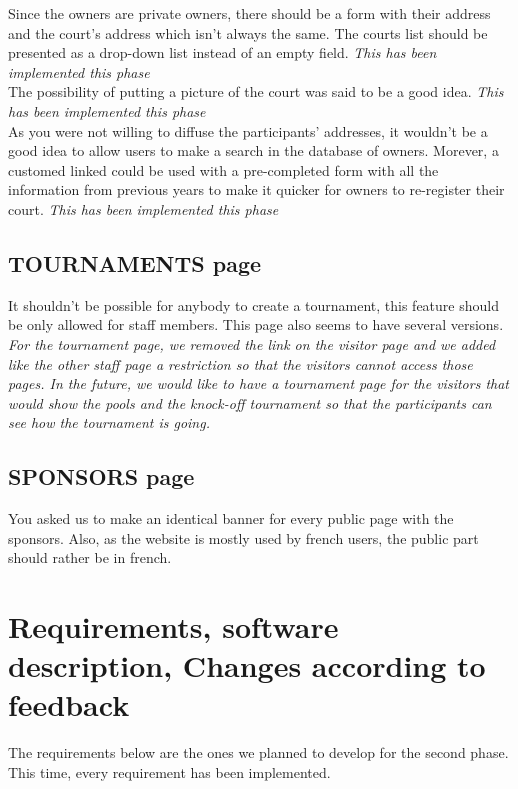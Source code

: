 \documentclass[a4paper, 12pt]{article}
\begin{document}
Since the owners are private owners, there should be a form with their address and the court's address which isn't always the same. The courts list should be presented as a drop-down list instead of an empty field. \textit{This has been implemented this phase}\\

The possibility of putting a picture of the court was said to be a good idea. \textit{This has been implemented this phase}\\

As you were not willing to diffuse the participants' addresses, it wouldn't be a good idea to allow users to make a search in the database of owners. Morever, a customed linked could be used with a pre-completed form with all the information from previous years to make it quicker for owners to re-register their court. \textit{This has been implemented this phase}

\subsection*{TOURNAMENTS page}
It shouldn't be possible for anybody to create a tournament, this feature should be only allowed for staff members. This page also seems to have several versions. \textit{For the tournament page, we removed the link on the visitor page and we added like the other staff page a restriction so that the visitors cannot access those pages. In the future, we would like to have a tournament page for the visitors that would show the pools and the knock-off tournament so that the participants can see how the tournament is going.}

\subsection*{SPONSORS page}

You asked us to make an identical banner for every public page with the sponsors. Also, as the website is mostly used by french users, the public part should rather be in french.

 
\section{Requirements, software description, Changes according to feedback}

The requirements below are the ones we planned to develop for the second phase. This time, every requirement has been implemented. \\
\end{document}

